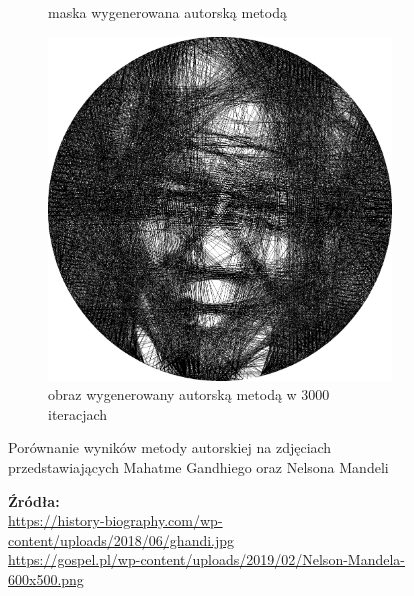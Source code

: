 \begin{figure}[H]
\begin{subfigure}{0.24\textwidth}
        \caption{maska wygenerowana autorską metodą}
        \label{comp-comp-gandhi-mandela-g}
    \end{subfigure}
    \begin{subfigure}{0.24\textwidth}
        \centering
        \includegraphics[width = \textwidth]{img/6-comp/mandela_e_i3000_c15_inv0_bg5_obj1_ed1.png}
        \caption{obraz wygenerowany autorską metodą w 3000 iteracjach}
        \label{comp-comp-gandhi-mandela-h}
    \end{subfigure}
    \caption{Porównanie wyników metody autorskiej na zdjęciach przedstawiających Mahatme Gandhiego oraz Nelsona Mandeli}
    \caption*{\footnotesize{\textbf{Źródła:}\\
    \url{https://history-biography.com/wp-content/uploads/2018/06/ghandi.jpg}\\
    {\url{https://gospel.pl/wp-content/uploads/2019/02/Nelson-Mandela-600x500.png}}}}
    \label{comp-comp-gandhi-mandela}
    \end{figure}

